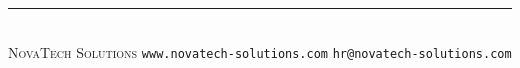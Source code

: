 \documentclass[11pt,a4paper,landscape]{article}
\begin{document}
\begin{center}
  \vfill

  {\color{accentlight}\rule{80mm}{0.3pt}}\\[3mm]
  {\color{dark!70}\fontsize{8.5}{11}\selectfont
    \faBuilding\;\textsc{NovaTech Solutions}
    \hspace{8mm}
    \faGlobe\;\texttt{www.novatech-solutions.com}
    \hspace{8mm}
    \faEnvelope\;\texttt{hr@novatech-solutions.com}}

\end{center}
\end{document}
